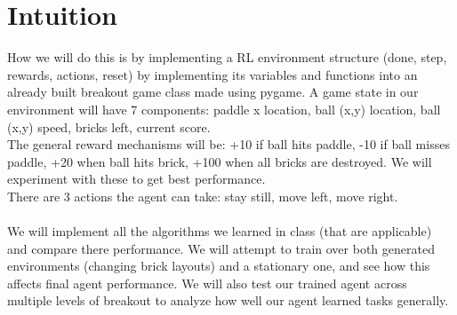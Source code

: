 \documentclass[twoside,11pt]{article}
\begin{document}
\section{Intuition}
How we will do this is by implementing a RL environment structure (done, step, rewards, actions, reset) by implementing its variables and functions into an already built breakout game class made using pygame. A game state in our environment will have 7 components: paddle x location,  ball (x,y) location, ball (x,y) speed, bricks left, current score. \\
The general reward mechanisms will be: +10 if ball hits paddle,  -10 if ball misses paddle, +20 when ball hits brick, +100 when all bricks are destroyed. We will experiment with these to get best performance. \\
There are 3 actions the agent can take: stay still, move left, move right.
\\\\
We will implement all the algorithms we learned in class (that are applicable) and compare there performance. We will attempt to train over both generated environments (changing brick layouts) and a stationary one, and see how this affects final agent performance. We will also test our trained agent across multiple levels of breakout to analyze how well our agent learned tasks generally.





\end{document}
